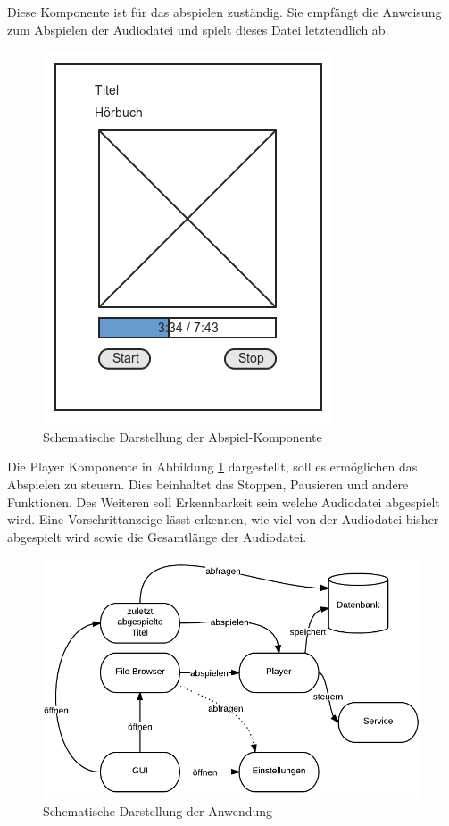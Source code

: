 Diese Komponente ist für das abspielen zuständig. Sie empfängt die Anweisung zum Abspielen der Audiodatei und spielt dieses Datei letztendlich ab.

\begin{figure}
\begin{center}
\includegraphics[scale=0.6]{images/playerkomp}
\caption{Schematische Darstellung der Abspiel-Komponente}
\label{playerkomp}
\end{center}
\end{figure}

Die Player Komponente in Abbildung \ref{playerkomp} dargestellt, soll es ermöglichen das Abspielen zu steuern. Dies beinhaltet das Stoppen, Pausieren und andere Funktionen. Des Weiteren soll Erkennbarkeit sein welche Audiodatei abgespielt wird. Eine Vorschrittanzeige lässt erkennen, wie viel von der Audiodatei bisher abgespielt wird sowie die Gesamtlänge der Audiodatei.

\begin{figure}
\begin{center}
\includegraphics[scale=0.6]{images/konzept}
\caption{Schematische Darstellung der Anwendung}
\label{konzept}
\end{center}
\end{figure}

